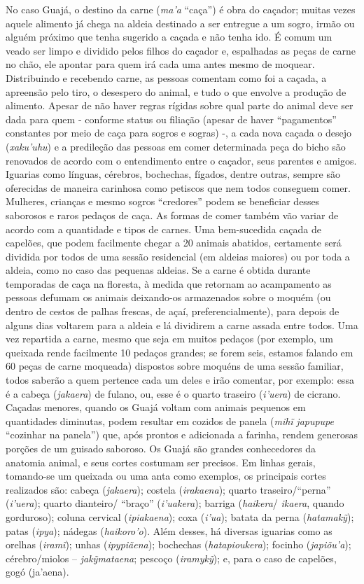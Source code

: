 No caso Guajá, o destino da carne (\emph{ma'a} ``caça'') é obra do
caçador; muitas vezes aquele alimento já chega na aldeia destinado a ser
entregue a um sogro, irmão ou alguém próximo que tenha sugerido a caçada
e não tenha ido. É comum um veado ser limpo e dividido pelos filhos do
caçador e, espalhadas as peças de carne no chão, ele apontar para quem
irá cada uma antes mesmo de moquear. Distribuindo e recebendo carne, as
pessoas comentam como foi a caçada, a apreensão pelo tiro, o desespero
do animal, e tudo o que envolve a produção de alimento. Apesar de não
haver regras rígidas sobre qual parte do animal deve ser dada para quem
- conforme status ou filiação (apesar de haver ``pagamentos'' constantes
por meio de caça para sogros e sogras) -, a cada nova caçada o desejo
(\emph{xaku'uhu}) e a predileção das pessoas em comer determinada peça
do bicho são renovados de acordo com o entendimento entre o caçador,
seus parentes e amigos. Iguarias como línguas, cérebros, bochechas,
fígados, dentre outras, sempre são oferecidas de maneira carinhosa como
petiscos que nem todos conseguem comer. Mulheres, crianças e mesmo
sogros ``credores'' podem se beneficiar desses saborosos e raros pedaços
de caça. As formas de comer também vão variar de acordo com a quantidade
e tipos de carnes. Uma bem-sucedida caçada de capelões, que podem
facilmente chegar a 20 animais abatidos, certamente será dividida por
todos de uma sessão residencial (em aldeias maiores) ou por toda a
aldeia, como no caso das pequenas aldeias. Se a carne é obtida durante
temporadas de caça na floresta, à medida que retornam ao acampamento as
pessoas defumam os animais deixando-os armazenados sobre o moquém (ou
dentro de cestos de palhas frescas, de açaí, preferencialmente), para
depois de alguns dias voltarem para a aldeia e lá dividirem a carne
assada entre todos. Uma vez repartida a carne, mesmo que seja em muitos
pedaços (por exemplo, um queixada rende facilmente 10 pedaços grandes;
se forem seis, estamos falando em 60 peças de carne moqueada) dispostos
sobre moquéns de uma sessão familiar, todos saberão a quem pertence cada
um deles e irão comentar, por exemplo: essa é a cabeça (\emph{jakaera})
de fulano, ou, esse é o quarto traseiro (\emph{i'uera}) de cicrano.
Caçadas menores, quando os Guajá voltam com animais pequenos em
quantidades diminutas, podem resultar em cozidos de panela (\emph{mihĩ}
\emph{japupupe} ``cozinhar na panela'') que, após prontos e adicionada a
farinha, rendem generosas porções de um guisado saboroso. Os Guajá são
grandes conhecedores da anatomia animal, e seus cortes costumam ser
precisos. Em linhas gerais, tomando-se um queixada ou uma anta como
exemplos, os principais cortes realizados são: cabeça (\emph{jakaera});
costela (\emph{irakaena}); quarto traseiro/``perna'' (\emph{i'uera});
quarto dianteiro/ ``braço'' (\emph{i'uakera}); barriga (\emph{haikera}/
\emph{ikaera}, quando gorduroso); coluna cervical (\emph{ipiakaena});
coxa (\emph{i'ua}); batata da perna (\emph{hatamakỹ}); patas
(\emph{ipya}); nádegas (\emph{haikoro'o}). Além desses, há diversas
iguarias como as orelhas (\emph{iramĩ}); unhas (\emph{ipypiãena});
bochechas (\emph{hatapioukera}); focinho (\emph{japiõu'a});
cérebro/miolos -- \emph{jakỹmataena}; pescoço (\emph{iramykỹ}); e, para
o caso de capelões, gogó (ja'aena).

